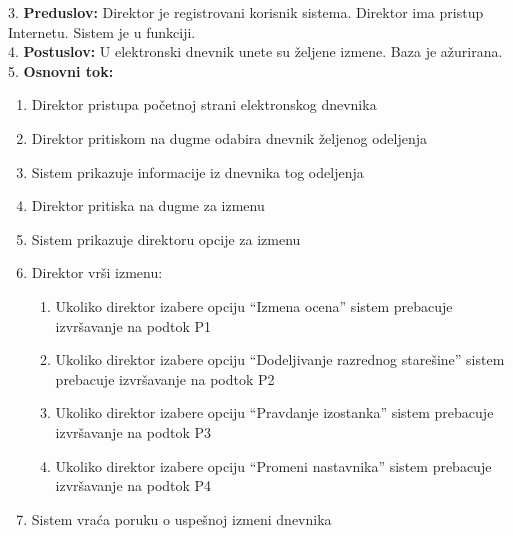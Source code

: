\documentclass{article}
\begin{document}
3. \textbf{Preduslov:} Direktor je registrovani korisnik sistema. Direktor ima pristup Internetu. Sistem je u funkciji. \\

4. \textbf{Postuslov:}  U elektronski dnevnik unete su željene izmene. Baza je ažurirana.\\

5. \textbf{Osnovni tok:} 
\begin{enumerate} [label=(\alph*)]
\item Direktor pristupa početnoj strani elektronskog dnevnika
\item Direktor pritiskom na dugme odabira dnevnik željenog odeljenja
\item Sistem prikazuje informacije iz dnevnika tog odeljenja
\item Direktor pritiska na dugme za izmenu
\item Sistem prikazuje direktoru opcije za izmenu
\item Direktor vrši izmenu:
\begin{enumerate} [label=(\roman*)]
    \item Ukoliko direktor izabere opciju ``Izmena ocena'' sistem prebacuje izvršavanje na podtok P1
    \item Ukoliko direktor izabere opciju ``Dodeljivanje razrednog starešine'' sistem prebacuje izvršavanje na podtok P2
    \item Ukoliko direktor izabere opciju ``Pravdanje izostanka'' sistem prebacuje izvršavanje na podtok P3
    \item Ukoliko direktor izabere opciju ``Promeni nastavnika'' sistem prebacuje izvršavanje na podtok P4
\end{enumerate}
\item Sistem vraća poruku o uspešnoj izmeni dnevnika

\end{enumerate}
\end{document}
